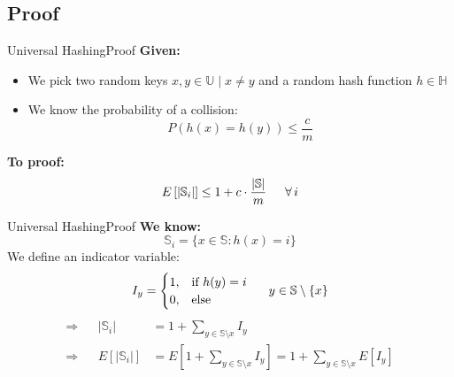 \subsection{Proof}

\begin{frame}{Universal Hashing}{Proof}
  \textbf{Given:}
  \begin{itemize}
    \item
      We pick two random keys {\color{Mittel-Blau}$x, y \in \mathbb{U} \mid x \neq y$} and
      a random hash function {\color{Mittel-Blau}$h \in \mathbb{H}$}
    \item
      We know the probability of a collision:
      {\color{Mittel-Blau}\[P(h(x) = h(y)) \leq \frac{c}{m}\]}
  \end{itemize}
  \textbf{To proof:}
  {\color{Mittel-Blau}\[E\left[\vert \mathbb{S}_i \vert\right]
     \leq 1 + c \cdot \frac{\vert \mathbb{S} \vert}{m}
     \hspace*{1.5em} \forall \, i\]}
\end{frame}


\begin{frame}{Universal Hashing}{Proof}
  \textbf{We know:}
  {\color{Mittel-Blau}\[\mathbb{S}_i = \{x \in \mathbb{S}: h(x) = i\}\]}
  We define an indicator variable:
  {\color{Mittel-Blau}
  \begin{displaymath}
    I_y = \begin{cases}
      1, & \text{if } h(y) = i\\
      0, & \text{else}
    \end{cases} \hspace*{1.5em} y \in \mathbb{S} \setminus \{x\}
  \end{displaymath}
  \begin{align*}
    \Rightarrow && \vert \mathbb{S}_i \vert
      & = 1 + \sum_{y \in \mathbb{S} \setminus x} I_y\\
    \Rightarrow && E\left[\vert \mathbb{S}_i \vert\right]
      & = E\left[1 + \sum_{y \in \mathbb{S} \setminus x} I_y\right]
        = 1 + \sum_{y \in \mathbb{S} \setminus x} E[I_y]
  \end{align*}}
\end{frame}


